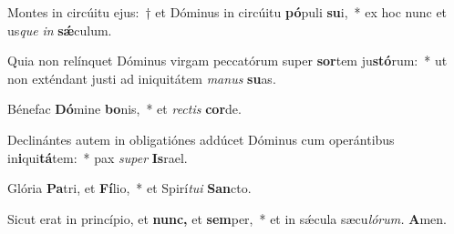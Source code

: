 \item Montes in circúitu ejus:~† et Dóminus in circúitu \textbf{pó}puli \textbf{su}i,~* ex hoc nunc et us\tinyhspace\textit{que} \textit{in} \textbf{sǽ}culum.
\item Quia non relínquet Dóminus virgam peccatórum super \textbf{sor}tem ju\textbf{stó}rum:~* ut non exténdant justi ad iniquitátem \textit{manus} \textbf{su}as.
\item Bénefac \textbf{Dó}mine \textbf{bo}nis,~* et \textit{rectis} \textbf{cor}de.
\item Declinántes autem in obligatiónes addúcet Dóminus cum operántibus in\textbf{i}qui\textbf{tá}tem:~* pax \textit{super} \textbf{Is}rael.
\item Glória \textbf{Pa}tri, et \textbf{Fí}lio,~* et Spirí\tinyhspace\textit{tui} \textbf{San}cto.
\item Sicut erat in princípio, et \textbf{nunc,} et \textbf{sem}per,~* et in sǽcula sæcu\textit{lórum.} \textbf{A}men.
